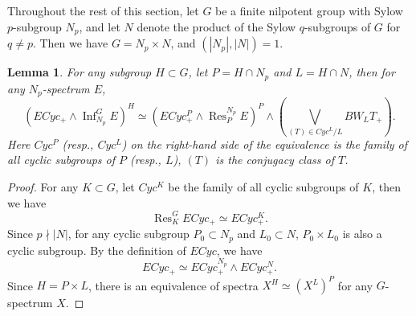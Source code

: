 \documentclass{amsart}
\theoremstyle{plain}
\newtheorem{lemma}[theorem]{Lemma}
\theoremstyle{definition}
\theoremstyle{remark}
\begin{document}
Throughout the rest of this section, let $G$ be a finite nilpotent group with Sylow $p$-subgroup $N_p$, and let $N$ denote the product of the Sylow $q$-subgroups of $G$ for $q\neq p$. Then we have $G=N_p\times N$, and $(|N_p|, |N|)=1$.
\begin{lemma}\label{lem:fixed point of ECyc and inflation}
    For any subgroup $H\subset G$, let $P=H\cap N_p$ and $L=H\cap N$, then for any $N_p$-spectrum $E$,
    \[ 
    (ECyc_+\wedge \operatorname{Inf}_{N_p}^G E)^H\simeq (ECyc^P_+ \wedge \operatorname{Res}_P^{N_p} E)^P \wedge (\bigvee_{(T)\in Cyc^L/L}BW_L T_+).
    \]
    Here $Cyc^P$ (resp., $Cyc^L$) on the right-hand side of the equivalence is the family of all cyclic subgroups of $P$ (resp., $L$), $(T)$ is the conjugacy class of $T$.
\end{lemma}
\begin{proof}
   For any $K\subset G$, let $Cyc^K$ be the family of all cyclic subgroups of $K$, then we have 
   \[
   \operatorname{Res}_K^G ECyc_+\simeq ECyc_+^K.
   \] 
   Since $p\nmid |N|$, for any cyclic subgroup $P_0\subset N_p$ and $L_0\subset N$, $P_0\times L_0$ is also a cyclic subgroup. By the definition of $ECyc$, we have
   \[
   ECyc_+\simeq ECyc^{N_p}_+\wedge ECyc^N_+.
   \]
    Since $H=P\times L$, there is an equivalence of spectra $X^H\simeq (X^L)^P$ for any $G$-spectrum $X$. 
    

\end{proof}
\end{document}

